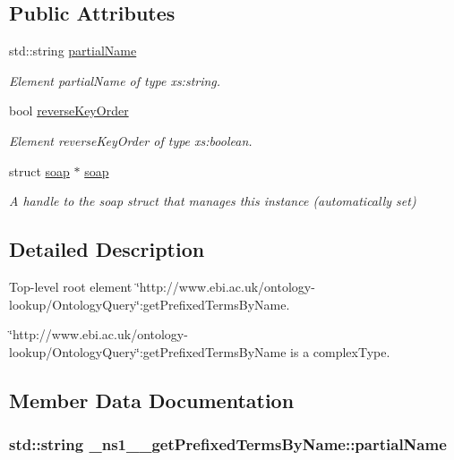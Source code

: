 \subsection*{Public Attributes}
\begin{DoxyCompactItemize}
\item 
std::string \hyperlink{class__ns1____getPrefixedTermsByName_ae1e40b1a9bfde22040190f72c589cb28}{partialName}
\begin{DoxyCompactList}\small\item\em Element partialName of type xs:string. \end{DoxyCompactList}\item 
bool \hyperlink{class__ns1____getPrefixedTermsByName_a3c050dd7de247ad1287009ee8c45124c}{reverseKeyOrder}
\begin{DoxyCompactList}\small\item\em Element reverseKeyOrder of type xs:boolean. \end{DoxyCompactList}\item 
\hypertarget{class__ns1____getPrefixedTermsByName_af38539df21398d2534c48de44bec37dc}{
struct \hyperlink{class__ns1____getPrefixedTermsByName_af38539df21398d2534c48de44bec37dc}{soap} $\ast$ \hyperlink{class__ns1____getPrefixedTermsByName_af38539df21398d2534c48de44bec37dc}{soap}}
\label{class__ns1____getPrefixedTermsByName_af38539df21398d2534c48de44bec37dc}

\begin{DoxyCompactList}\small\item\em A handle to the soap struct that manages this instance (automatically set) \end{DoxyCompactList}\end{DoxyCompactItemize}


\subsection{Detailed Description}
Top-\/level root element \char`\"{}http://www.ebi.ac.uk/ontology-\/lookup/OntologyQuery\char`\"{}:getPrefixedTermsByName. 

\char`\"{}http://www.ebi.ac.uk/ontology-\/lookup/OntologyQuery\char`\"{}:getPrefixedTermsByName is a complexType. 

\subsection{Member Data Documentation}
\hypertarget{class__ns1____getPrefixedTermsByName_ae1e40b1a9bfde22040190f72c589cb28}{
\subsubsection[{partialName}]{\setlength{\rightskip}{0pt plus 5cm}std::string {\bf \_\-ns1\_\-\_\-getPrefixedTermsByName::partialName}}}
\label{class__ns1____getPrefixedTermsByName_ae1e40b1a9bfde22040190f72c589cb28}


